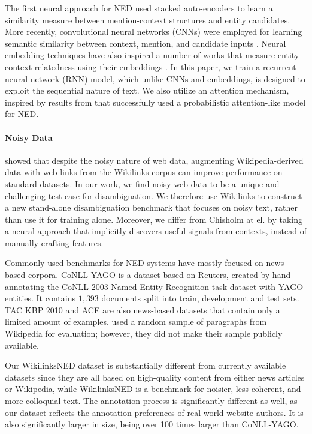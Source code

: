 \documentclass[11pt,a4paper]{article}
\begin{document}
	The first neural approach for NED \cite{he2013learning} used stacked auto-encoders to learn a similarity measure between mention-context structures and entity candidates. More recently, convolutional neural networks (CNNs) were employed for learning semantic similarity between context, mention, and candidate inputs \cite{sun2015modeling,francis2016capturing}. Neural embedding techniques have also inspired a number of works that measure entity-context relatedness using their embeddings \cite{yamada2016joint,Hu2015Entity}. In this paper, we train a recurrent neural network (RNN) model, which unlike CNNs and embeddings, is designed to exploit the sequential nature of text. We also utilize an attention mechanism, inspired by results from  that successfully used a probabilistic attention-like model for NED.
	
	\paragraph{Noisy Data}
	
	 showed that despite the noisy nature of web data, augmenting Wikipedia-derived data with web-links from the Wikilinks corpus \cite{singh12:wiki-links} can improve performance on standard datasets. 
	In our work, we find noisy web data to be a unique and challenging test case for disambiguation. We therefore use Wikilinks to construct a new stand-alone disambiguation benchmark that focuses on noisy text, rather than use it for training alone. 
	Moreover, we differ from Chisholm at el. by taking a neural approach that implicitly discovers useful signals from contexts, instead of manually crafting features.
	
	Commonly-used benchmarks for NED systems have mostly focused on news-based corpora. CoNLL-YAGO \cite{hoffart2011robust} is a dataset based on Reuters, created by hand-annotating the CoNLL 2003 Named Entity Recognition task dataset with YAGO \cite{suchanek2007} entities. It contains $1,393$ documents split into train, development and test sets. TAC KBP 2010 \cite{ji2010overview} and ACE  are also news-based datasets that contain only a limited amount of examples.  used a random sample of paragraphs from Wikipedia for evaluation; however, they did not make their sample publicly available.
	
	Our WikilinksNED dataset is substantially different from currently available datasets since they are all based on high-quality content from either news articles or Wikipedia, while WikilinksNED is a benchmark for noisier, less coherent, and more colloquial text. The annotation process is significantly different as well, as our dataset reflects the annotation preferences of real-world website authors. It is also significantly larger in size, being over 100 times larger than CoNLL-YAGO.
	
\end{document}
